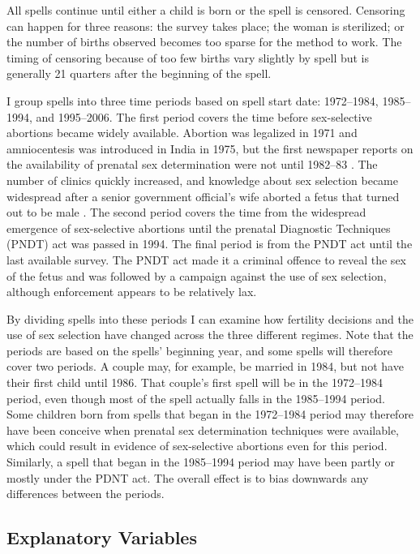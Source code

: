 \documentclass[12pt,letterpaper]{article}
\begin{document}
All spells continue until either a child is born or the spell is censored.
Censoring can happen for three reasons:
the survey takes place;
the woman is sterilized;
or the number of births observed becomes too sparse for the method to work.
The timing of censoring because of too few births vary slightly by spell but is generally 
21 quarters after the beginning of the spell.

I group spells into three time periods based on spell start date:
1972--1984, 1985--1994, and 1995--2006.
The first period covers the time before sex-selective abortions became widely available.
Abortion was legalized in 1971 and amniocentesis was introduced
in India in 1975, but the first newspaper reports on the availability of prenatal sex 
determination were not until 1982--83 \citep{Sudha1999,bhat06,Grover2006}.
The number of clinics quickly increased, and knowledge about sex selection became widespread
after a senior government official's wife aborted a fetus that turned out to be male \citep[p.\ 598]{Sudha1999}.
The second period covers the time from the widespread emergence of sex-selective abortions
until the prenatal Diagnostic Techniques (PNDT) act was passed in 1994.
The final period is from the PNDT act until the last available survey.
The PNDT act made it a criminal offence to reveal the sex of the fetus and was
followed by a campaign against the use of sex selection, although
enforcement appears to be relatively lax.

By dividing spells into these periods I can examine how fertility
decisions and the use of sex selection have changed across the three different regimes.
Note that the periods are based on the spells' beginning year, and some spells 
will therefore cover two periods.
A couple may, for example, be married in 1984, but not have their first child until 1986.
That couple's first spell will be in the 1972--1984 period, even though most of the 
spell actually falls in the 1985--1994 period.
Some children born from spells that began in the 1972--1984 period may therefore have been
conceive when prenatal sex determination techniques were available, which could result
in evidence of sex-selective abortions even for this period.
Similarly, a spell that began in the 1985--1994 period may have been partly or mostly
under the PDNT act.
The overall effect is to bias downwards any differences between the periods.

\subsection{Explanatory Variables}
\end{document}
